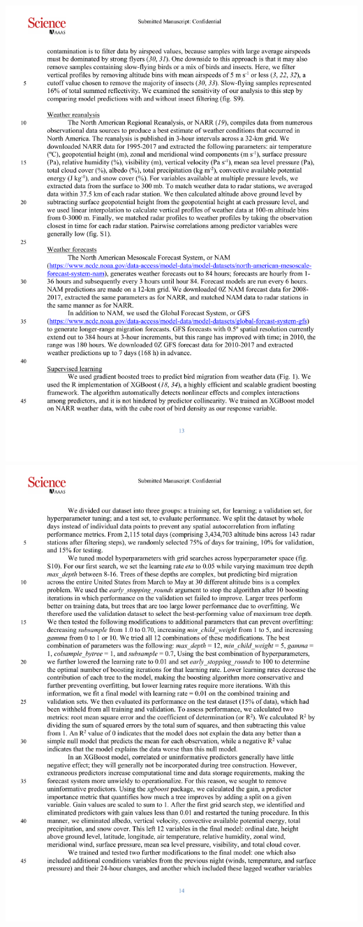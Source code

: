 \documentclass[a4paper, twoside]{templates/ociamthesis}
\begin{document}
\includegraphics[width=1\linewidth]{pdf_chapters/forecast/forecast_supp_crop_Part03}
\includegraphics[width=1\linewidth]{pdf_chapters/forecast/forecast_supp_crop_Part04}
\end{document}
